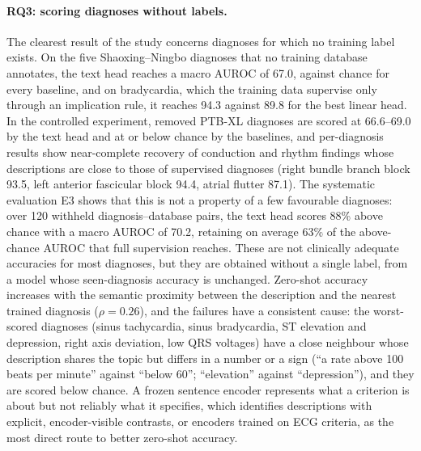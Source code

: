 \paragraph{RQ3: scoring diagnoses without labels.}
The clearest result of the study concerns diagnoses for which no training label exists. On the five Shaoxing--Ningbo diagnoses that no training database annotates, the text head reaches a macro AUROC of 67.0, against chance for every baseline, and on bradycardia, which the training data supervise only through an implication rule, it reaches 94.3 against 89.8 for the best linear head. In the controlled experiment, removed PTB-XL diagnoses are scored at 66.6--69.0 by the text head and at or below chance by the baselines, and per-diagnosis results show near-complete recovery of conduction and rhythm findings whose descriptions are close to those of supervised diagnoses (right bundle branch block 93.5, left anterior fascicular block 94.4, atrial flutter 87.1). The systematic evaluation E3 shows that this is not a property of a few favourable diagnoses: over 120 withheld diagnosis--database pairs, the text head scores 88\% above chance with a macro AUROC of 70.2, retaining on average 63\% of the above-chance AUROC that full supervision reaches. These are not clinically adequate accuracies for most diagnoses, but they are obtained without a single label, from a model whose seen-diagnosis accuracy is unchanged. Zero-shot accuracy increases with the semantic proximity between the description and the nearest trained diagnosis ($\rho=0.26$), and the failures have a consistent cause: the worst-scored diagnoses (sinus tachycardia, sinus bradycardia, ST elevation and depression, right axis deviation, low QRS voltages) have a close neighbour whose description shares the topic but differs in a number or a sign (``a rate above 100 beats per minute'' against ``below 60''; ``elevation'' against ``depression''), and they are scored below chance. A frozen sentence encoder represents what a criterion is about but not reliably what it specifies, which identifies descriptions with explicit, encoder-visible contrasts, or encoders trained on ECG criteria, as the most direct route to better zero-shot accuracy.

